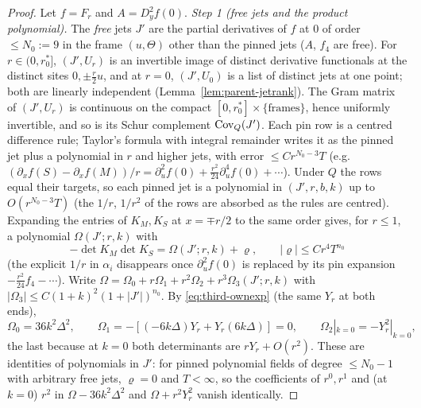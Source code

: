 \begin{proof}
Let $f=F_r$ and $A=D_y^2f(0)$.
\emph{Step 1 (free jets and the product polynomial).} The \emph{free} jets $J'$ are the partial derivatives of $f$ at $0$ of order $\le N_0:=9$ in the frame $(u,\Theta)$ other than the pinned jets ($A$, $f_4$ are free). For $r\in(0,r_0^*]$, $(J',U_r)$ is an invertible image of distinct derivative functionals at the distinct sites $0,\pm\frac r2u$, and at $r=0$, $(J',U_0)$ is a list of distinct jets at one point; both are linearly independent \cite{parentP} (Lemma~\ref{lem:parent-jetrank}). The Gram matrix of $(J',U_r)$ is continuous on the compact $[0,r_0^*]\times\{\text{frames}\}$, hence uniformly invertible, and so is its Schur complement $\operatorname{Cov}_Q(J')$. Each pin row is a centred difference rule; Taylor's formula with integral remainder writes it as the pinned jet plus a polynomial in $r$ and higher jets, with error $\le Cr^{N_0-3}T$ (e.g.\ $(\partial_xf(S)-\partial_xf(M))/r=\partial_u^2f(0)+\frac{r^2}{24}\partial_u^4f(0)+\cdots$). Under $Q$ the rows equal their targets, so each pinned jet is a polynomial in $(J',r,b,k)$ up to $O(r^{N_0-3}T)$ (the $1/r$, $1/r^2$ of the rows are absorbed as the rules are centred). Expanding the entries of $K_M,K_S$ at $x=\mp r/2$ to the same order gives, for $r\le1$, a polynomial $\Omega(J';r,k)$ with
\begin{equation}\label{eq:third-Omega}
-\det K_M\det K_S=\Omega(J';r,k)+\varrho,\qquad |\varrho|\le Cr^4T^{n_0}
\end{equation}
(the explicit $1/r$ in $\alpha_i$ disappears once $\partial_u^2f(0)$ is replaced by its pin expansion $-\frac{r^2}{24}f_4-\cdots$). Write $\Omega=\Omega_0+r\Omega_1+r^2\Omega_2+r^3\Omega_3(J';r,k)$ with $|\Omega_3|\le C(1+k)^2(1+|J'|)^{n_0}$. By \eqref{eq:third-ownexp} (the same $Y_r$ at both ends),
\begin{equation}\label{eq:third-Omega012}
\Omega_0=36k^2\Delta^2,\qquad \Omega_1=-[(-6k\Delta)Y_r+Y_r(6k\Delta)]=0,\qquad \Omega_2|_{k=0}=-Y_r^2|_{k=0},
\end{equation}
the last because at $k=0$ both determinants are $rY_r+O(r^2)$. These are identities of polynomials in $J'$: for pinned polynomial fields of degree $\le N_0-1$ with arbitrary free jets, $\varrho=0$ and $T<\infty$, so the coefficients of $r^0,r^1$ and (at $k=0$) $r^2$ in $\Omega-36k^2\Delta^2$ and $\Omega+r^2Y_r^2$ vanish identically.


\end{proof}

